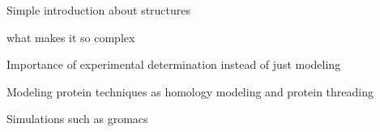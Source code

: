 Simple introduction about structures 

what makes it so complex 

Importance of experimental determination instead of just modeling

Modeling protein techniques as homology modeling and protein threading

Simulations such as gromacs 